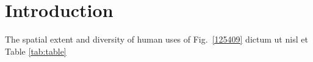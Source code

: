 \section{Introduction}
\label{introduction}

The spatial extent and diversity of human uses of  Fig.~\ref{125409} dictum ut nisl et Table \ref{tab:table}
